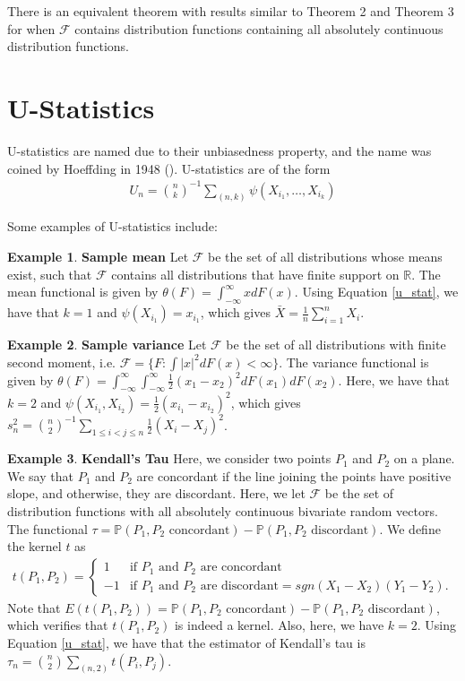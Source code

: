 \documentclass{article}
\newcommand{\R}{{\mathbb{R}}}
\theoremstyle{definition}
\numberwithin{Def}{section}
\newtheorem{ex}{Example}
\begin{document}
 There is an equivalent theorem with results similar to Theorem 2 and Theorem 3 for when $\mathcal{F}$ contains distribution functions containing all absolutely continuous distribution functions. 
 
    \section{U-Statistics}
    U-statistics are named due to their unbiasedness property, and the name was coined by Hoeffding in 1948 (\cite{hoeffding1948}). U-statistics are of the form 
    \begin{align}\label{u_stat}
        U_n = {n \choose k}^{-1}\sum_{(n,k)}\psi(X_{i_1}, \dotsc, X_{i_k})
    \end{align}

Some examples of U-statistics include:
\begin{ex}\textbf{Sample mean}
Let $\mathcal{F}$ be the set of all distributions whose means exist, such that $\mathcal{F}$ contains all distributions that have finite support on $\R$. The mean functional is given by $\theta(F) = \int_{-\infty}^{\infty} x dF(x)$. Using Equation \ref{u_stat}, we have that $k=1$ and $\psi(X_{i_1}) = x_{i_1}$, which gives $\bar{X} = \frac{1}{n}\sum_{i=1}^n X_i$.
\end{ex}

\begin{ex}\textbf{Sample variance}
Let $\mathcal{F}$ be the set of all distributions with finite second moment, i.e. $\mathcal{F} = \{F: \int |x|^2 dF(x)<\infty\}$. The variance functional is given by $\theta(F) = \int_{-\infty}^{\infty} \int_{-\infty}^{\infty} \frac{1}{2}(x_1 - x_2)^2 dF(x_1)dF(x_2)$. Here, we have that $k=2$ and $\psi(X_{i_1}, X_{i_2}) = \frac{1}{2}(x_{i_1} - x_{i_2})^2$, which gives $s_n^2 = {n \choose 2}^{-1}\sum_{1 \leq i < j \leq n}\frac{1}{2}(X_i - X_j)^2$.
\end{ex}

\begin{ex}\textbf{Kendall's Tau} Here, we consider two points $P_1$ and $P_2$ on a plane. We say that $P_1$ and $P_2$ are concordant if the line joining the points have positive slope, and otherwise, they are discordant. Here, we let $\mathcal{F}$ be the set of distribution functions with all absolutely continuous bivariate random vectors. The functional $\tau = \mathbb{P}(P_1, P_2 \text{ concordant}) - \mathbb{P}(P_1, P_2 \text{ discordant})$. We define the kernel $t$ as 
\begin{align*}
    t(P_1, P_2) = \begin{cases} 1 & \text{if $P_1$ and $P_2$ are concordant} \\ -1 & \text{if $P_1$ and $P_2$ are discordant} = sgn(X_1 - X_2)(Y_1 - Y_2).
    \end{cases}
\end{align*}
Note that $E(t(P_1, P_2)) = \mathbb{P}(P_1, P_2 \text{ concordant}) - \mathbb{P}(P_1, P_2 \text{ discordant})$, which verifies that $t(P_1, P_2)$ is indeed a kernel. Also, here, we have $k=2$. Using Equation \ref{u_stat}, we have that the estimator of Kendall's tau is $\tau_n = {n \choose 2}\sum_{(n,2)}t(P_i, P_j)$.
\end{ex}
\end{document}
